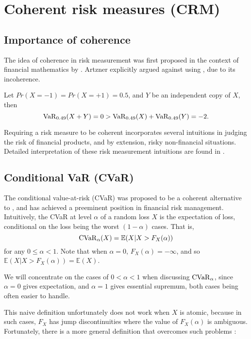 \section{Coherent risk measures (CRM)}
\label{sec:crm}

\subsection{Importance of coherence}
The idea of coherence in risk measurement was first proposed in the context of financial mathematics by \cite{artznerCoherentMeasuresRisk1999}. Artzner explicitly argued against using \var, due to its incoherence.

\begin{ex}
Let $Pr(X=-1) = Pr(X=+1) = 0.5$, and $Y$ be an independent copy of $X$, then 
$$\operatorname{VaR}_{0.49}(X+Y) = 0 > \operatorname{VaR}_{0.49}(X) + \operatorname{VaR}_{0.49}(Y) = -2.$$
\end{ex}

Requiring a risk measure to be coherent incorporates several intuitions in judging the risk of financial products, and by extension, risky non-financial situations. Detailed interpretation of these risk measurement intuitions are found in \cite{artznerCoherentMeasuresRisk1999}. 

\subsection{Conditional VaR (CVaR)}
The conditional value-at-risk (CVaR) was proposed to be a coherent alternative to \var, and has achieved a preeminent position in financial risk management. Intuitively, the CVaR at level $\alpha$ of a random loss $X$ is the expectation of loss, conditional on the loss being the worst $(1-\alpha)$ cases. That is, 
\begin{equation}
\label{eq:preliminary_cvar}
\operatorname{CVaR}_\alpha(X) = \mathbb{E}(X | X > F_X(\alpha))
\end{equation}
for any $0\le\alpha < 1$. Note that when $\alpha = 0$, $F_X(\alpha)= -\infty$, and so $\mathbb{E}(X | X > F_X(\alpha)) = \mathbb{E}(X)$.

\begin{remark}
We will concentrate on the cases of $0<\alpha < 1$ when discussing $\operatorname{CVaR}_\alpha$, since $\alpha = 0$ gives expectation, and $\alpha = 1$ gives essential supremum, both cases being often easier to handle.
\end{remark}

This naive definition unfortunately does not work when $X$ is atomic, because in such cases, $F_X$ has jump discontinuities where the value of $F_X(\alpha)$ is ambiguous. Fortunately, there is a more general definition that overcomes such problems \cite[Definition 3]{rockafellarConditionalValueatriskGeneral2002}:

